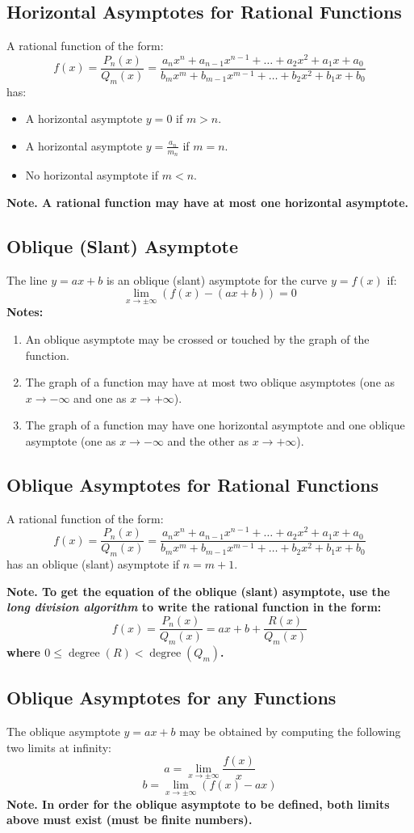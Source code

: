 \subsection{Horizontal Asymptotes for Rational Functions}
	A rational function of the form:
	\[f(x) = \frac{P_n(x)}{Q_m(x)} = \frac{a_nx^n + a_{n-1}x^{n-1} + \dots + a_2x^2 + a_1x + a_0}{b_mx^m + b_{m-1}x^{m-1} + \dots + b_2x^2 + b_1x + b_0}\]
	has:
	\begin{itemize}
		\item A horizontal asymptote $y=0$ if $m>n$.
		\item A horizontal asymptote $y=\frac{a_n}{m_n}$ if $m=n$.
		\item No horizontal asymptote if $m<n$.
	\end{itemize}
	\textbf{Note. A rational function may have at most one horizontal asymptote.}
\subsection{Oblique (Slant) Asymptote}
	The line $y=ax + b$ is an oblique (slant) asymptote for the curve $y=f(x)$ if:
	\[\lim_{x \to \pm\infty} \left( f(x) - (ax+b) \right) = 0\]
	\textbf{Notes:}
	\begin{enumerate}
		\item An oblique asymptote may be crossed or touched by the graph of the function.
		\item The graph of a function may have at most two oblique asymptotes (one as $x \to -\infty$ and one as $x \to +\infty$).
		\item The graph of a function may have one horizontal asymptote and one oblique asymptote (one as $x \to -\infty$ and the other as $x \to +\infty$).
	\end{enumerate}
\subsection{Oblique Asymptotes for Rational Functions}
	A rational function of the form:
	\[f(x) = \frac{P_n(x)}{Q_m(x)} = \frac{a_nx^n + a_{n-1}x^{n-1} + \dots + a_2x^2 + a_1x + a_0}{b_mx^m + b_{m-1}x^{m-1} + \dots + b_2x^2 + b_1x + b_0}\]
	has an oblique (slant) asymptote if $n=m+1$.

	\textbf{Note. To get the equation of the oblique (slant) asymptote, use the \emph{long division algorithm} to write the rational function in the form:}
	\[f(x) = \frac{P_n(x)}{Q_m(x)} = ax+b+\frac{R(x)}{Q_m(x)}\]
	\textbf{where $0 \leq \operatorname{degree}(R) < \operatorname{degree}(Q_m)$.}
\subsection{Oblique Asymptotes for any Functions}
	The oblique asymptote $y=ax+b$ may be obtained by computing the following two limits at infinity:
	\[a = \lim_{x \to \pm\infty} \frac{f(x)}{x}\]
	\[b = \lim_{x \to \pm\infty} \left( f(x) - ax \right)\]
	\textbf{Note. In order for the oblique asymptote to be defined, both limits above must exist (must be finite numbers).}
